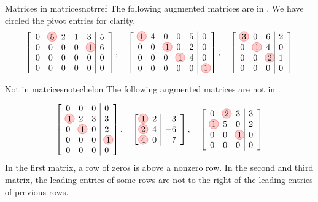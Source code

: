 \begin{example}{Matrices in {\EF}}{matricesnotrref}
  The following augmented matrices are in {\ef}. We have circled the
  pivot entries for clarity.
  \begin{equation*}
    \leftB
    \begin{array}{rrrrr|r}
      0 & \circled{5} & 2 & 1 & 3 & 5 \\
      0 & 0 & 0 & 0 & \circled{1} & 6 \\
      0 & 0 & 0 & 0 & 0 & 0 \\
      0 & 0 & 0 & 0 & 0 & 0
    \end{array}
    \rightB, \quad \leftB
    \begin{array}{rrrrr|r}
      \circled{1} & 4 & 0 & 0 & 5 & 0 \\
      0 & 0 & \circled{1} & 0 & 2 & 0 \\
      0 & 0 & 0 & \circled{1} & 4 & 0 \\
      0 & 0 & 0 & 0 & 0 & \circled{1}
    \end{array}
    \rightB, \quad \leftB
    \begin{array}{rrr|r}
      \circled{3} & 0 & 6 & 2 \\
      0 & \circled{1} & 4 & 0 \\
      0 & 0 & \circled{2} & 1 \\
      0 &  0 & 0 & 0
    \end{array}
    \rightB
  \end{equation*}
\end{example}

\begin{example}{Not in {\EF}}{matricesnotechelon}
The following augmented matrices are not in {\ef}. 

\begin{equation*}
\leftB
\begin{array}{rrr|r}
0 & 0 & 0 & 0 \\
\circled{1} & 2 & 3 & 3 \\
0 & \circled{1} & 0 & 2 \\
0 & 0 & 0 & \circled{1} \\
0 & 0 & 0 & 0
\end{array}
\rightB, \quad \leftB
\begin{array}{rr|r}
\circled{1} & 2 & 3 \\
\circled{2} & 4 & -6 \\
\circled{4} & 0 & 7
\end{array}
\rightB, \quad \leftB
\begin{array}{rrr|r}
0 & \circled{2} & 3 & 3 \\
\circled{1} & 5 & 0 & 2 \\
0 & 0 & \circled{1} & 0 \\
0 & 0 & 0 & 0
\end{array}
\rightB 
\end{equation*}
In the first matrix, a row of zeros is above a nonzero row. In the
second and third matrix, the leading entries of some rows are not to
the right of the leading entries of previous rows.
\end{example}

